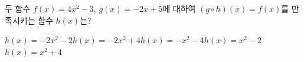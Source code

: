 두 함수 $f(x)=4x^2-3$, $g(x)=-2x+5$에 대하여 $(g\circ h)(x)=f(x)$를 만족시키는 함수 $h(x)$는?
\begin{choicesii}{$h(x)=-2x^2-2$}{$h(x)=-2x^2+4$}{$h(x)=-x^2-4$}{$h(x)=x^2-2$}{$h(x)=x^2+4$}\end{choicesii}
